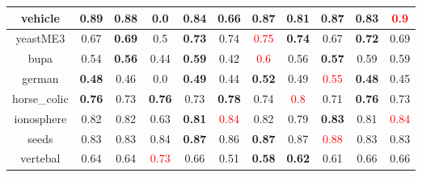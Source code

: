 \documentclass{article}%
\begin{document}
\begin{tabular}{c|cccccccccc}
\hline%
vehicle&\textbf{0.89}&0.88&0.0&\textbf{0.84}&0.66&\textbf{0.87}&0.81&\textbf{0.87}&0.83&\textcolor{red}{ 
0.9
}\\%
\hline%
yeastME3&0.67&\textbf{0.69}&0.5&\textbf{0.73}&0.74&\textcolor{red}{ 
0.75
}&\textbf{0.74}&0.67&\textbf{0.72}&0.69\\%
\hline%
bupa&0.54&\textbf{0.56}&0.44&\textbf{0.59}&0.42&\textcolor{red}{ 
0.6
}&0.56&\textbf{0.57}&0.59&0.59\\%
\hline%
german&\textbf{0.48}&0.46&0.0&\textbf{0.49}&0.44&\textbf{0.52}&0.49&\textcolor{red}{ 
0.55
}&\textbf{0.48}&0.45\\%
\hline%
horse\_colic&\textbf{0.76}&0.73&\textbf{0.76}&0.73&\textbf{0.78}&0.74&\textcolor{red}{ 
0.8
}&0.71&\textbf{0.76}&0.73\\%
\hline%
ionosphere&0.82&0.82&0.63&\textbf{0.81}&\textcolor{red}{ 
0.84
}&0.82&0.79&\textbf{0.83}&0.81&\textcolor{red}{ 
0.84
}\\%
\hline%
seeds&0.83&0.83&0.84&\textbf{0.87}&0.86&\textbf{0.87}&0.87&\textcolor{red}{ 
0.88
}&0.83&0.83\\%
\hline%
vertebal&0.64&0.64&\textcolor{red}{ 
0.73
}&0.66&0.51&\textbf{0.58}&\textbf{0.62}&0.61&0.66&0.66\\%
\hline%
\end{tabular}

%
\end{document}
